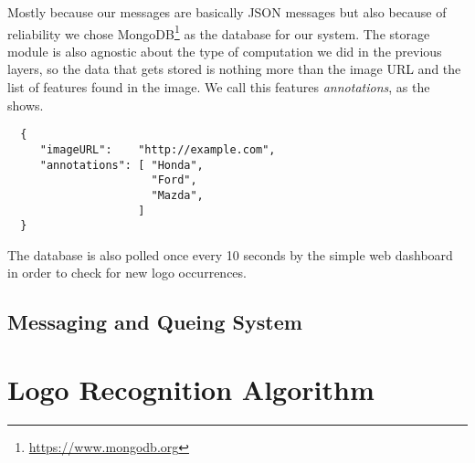 Mostly because our messages are basically JSON messages but also because of
reliability we chose MongoDB\footnote{\url{https://www.mongodb.org}} as the
database for our system. The storage module is also agnostic about the type of
computation we did in the previous layers, so the data that gets stored is
nothing more than the image URL and the list of features found in the image.
We call this features \textit{annotations}, as the
 shows.

\lstset{caption=MongoDB Document,label=lst:mongo-json}
\begin{lstlisting}
  {
     "imageURL":    "http://example.com",
     "annotations": [ "Honda",
                      "Ford",
                      "Mazda",
                    ]
  }
\end{lstlisting}

The database is also polled once every 10 seconds by the simple web dashboard
in order to check for new logo occurrences.

\subsection{Messaging and Queing System}
\label{sub-sec:q-system}


\section{Logo Recognition Algorithm}
\label{sec:logo-alg}
